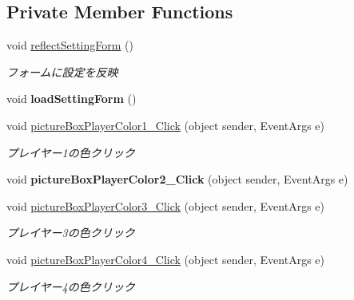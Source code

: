 \subsection*{Private Member Functions}
\begin{DoxyCompactItemize}
\item 
void \hyperlink{class_reversi4color_form_1_1_setting_form_a33a42eed1cef78b8906da8ff65874ecd}{reflect\+Setting\+Form} ()
\begin{DoxyCompactList}\small\item\em フォームに設定を反映 \end{DoxyCompactList}\item 
\mbox{\label{class_reversi4color_form_1_1_setting_form_a1a98117a11a7cb495c1ccc0fac870391}} 
void {\bfseries load\+Setting\+Form} ()
\item 
void \hyperlink{class_reversi4color_form_1_1_setting_form_a23d56ca250e5a1e9df3895e24ed86a76}{picture\+Box\+Player\+Color1\+\_\+\+Click} (object sender, Event\+Args e)
\begin{DoxyCompactList}\small\item\em プレイヤー1の色クリック \end{DoxyCompactList}\item 
\mbox{\label{class_reversi4color_form_1_1_setting_form_a583fbc50276c31154ce00d569cb1b5ad}} 
void {\bfseries picture\+Box\+Player\+Color2\+\_\+\+Click} (object sender, Event\+Args e)
\item 
void \hyperlink{class_reversi4color_form_1_1_setting_form_aa2158dc2c149e15b72ce6b6a7a8e3809}{picture\+Box\+Player\+Color3\+\_\+\+Click} (object sender, Event\+Args e)
\begin{DoxyCompactList}\small\item\em プレイヤー3の色クリック \end{DoxyCompactList}\item 
void \hyperlink{class_reversi4color_form_1_1_setting_form_ab63992b26a7b6709437689625b8a1143}{picture\+Box\+Player\+Color4\+\_\+\+Click} (object sender, Event\+Args e)
\begin{DoxyCompactList}\small\item\em プレイヤー4の色クリック \end{DoxyCompactList}\item 
\mbox{\label{class_reversi4color_form_1_1_setting_form_a2bd03c01205d452246ed61388c3ddbae}} 

\end{DoxyCompactItemize}
